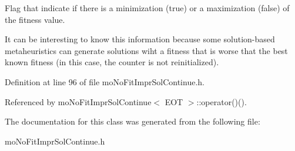 Flag that indicate if there is a minimization (true) or a maximization (false) of the fitness value. 

It can be interesting to know this information because some solution-based metaheuristics can generate solutions wiht a fitness that is worse that the best known fitness (in this case, the counter is not reinitialized). 

Definition at line 96 of file moNoFitImprSolContinue.h.

Referenced by moNoFitImprSolContinue$<$ EOT $>$::operator()().

The documentation for this class was generated from the following file:\begin{CompactItemize}
\item 
moNoFitImprSolContinue.h\end{CompactItemize}

